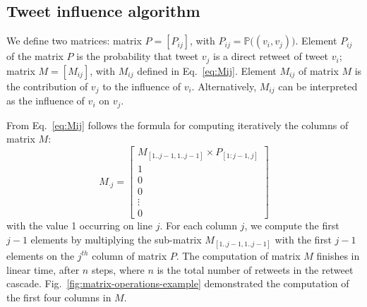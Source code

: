 
\subsection{Tweet influence algorithm}

We define two matrices:
matrix $P = [ P_{ij} ]$, with $P_{ij} = \mathds{P}\big((v_i, v_j)\big)$.
Element $P_{ij}$ of the matrix $P$ is the probability that tweet $v_j$ is a direct retweet of tweet $v_i$;
matrix $M = [ M_{ij} ]$, with $M_{ij}$ defined in Eq.~\eqref{eq:Mij}.
Element $M_{ij}$ of matrix $M$ is the contribution of $v_j$ to the influence of $v_i$.
Alternatively, $M_{ij}$ can be interpreted as the influence of $v_i$ on $v_j$.

From Eq.~\eqref{eq:Mij} follows the formula for computing iteratively the columns of matrix $M$:
\begin{equation} \label{eq:Mij-matrix}
M_{ \cdot j}=
\left[
\begin{array}{c}
M_{[1..j-1, 1..j-1]} \times P_{[1:j-1,j]} \\
1 \\
0 \\
0 \\
\vdots \\
0 
\end{array}
\right]
\end{equation}
with the value 1 occurring on line $j$.
For each column $j$, we compute the first $j-1$ elements by multiplying the sub-matrix $M_{[1..j-1, 1..j-1]}$ with the first $j-1$ elements on the $j^{th}$ column of matrix $P$.
The computation of matrix $M$ finishes in linear time, after $n$ steps, where $n$ is the total number of retweets in the retweet cascade.
Fig.~\ref{fig:matrix-operations-example} demonstrated the computation of the first four columns in $M$.
